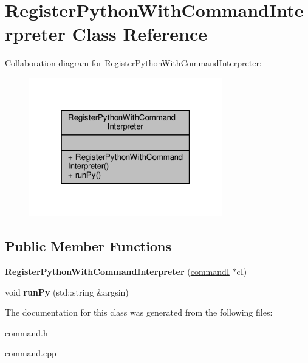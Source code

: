 \hypertarget{classRegisterPythonWithCommandInterpreter}{}\section{Register\+Python\+With\+Command\+Interpreter Class Reference}
\label{classRegisterPythonWithCommandInterpreter}


Collaboration diagram for Register\+Python\+With\+Command\+Interpreter\+:
\nopagebreak
\begin{figure}[H]
\begin{center}
\leavevmode
\includegraphics[width=238pt]{d4/df5/classRegisterPythonWithCommandInterpreter__coll__graph}
\end{center}
\end{figure}
\subsection*{Public Member Functions}
\begin{DoxyCompactItemize}
\item 
{\bfseries Register\+Python\+With\+Command\+Interpreter} (\hyperlink{classcommandI}{commandI} $\ast$cI)\hypertarget{classRegisterPythonWithCommandInterpreter_a3352994f62d7374331183c94a6dfa61e}{}\label{classRegisterPythonWithCommandInterpreter_a3352994f62d7374331183c94a6dfa61e}

\item 
void {\bfseries run\+Py} (std\+::string \&argsin)\hypertarget{classRegisterPythonWithCommandInterpreter_a53378b27d5e16fb8da3b8578a83f5b98}{}\label{classRegisterPythonWithCommandInterpreter_a53378b27d5e16fb8da3b8578a83f5b98}

\end{DoxyCompactItemize}


The documentation for this class was generated from the following files\+:\begin{DoxyCompactItemize}
\item 
command.\+h\item 
command.\+cpp\end{DoxyCompactItemize}
